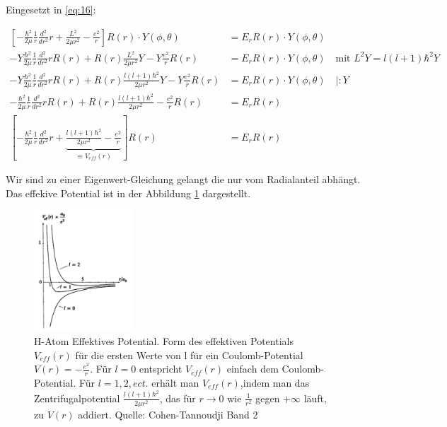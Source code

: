 Eingesetzt in \eqref{eq:16}:

\begin{align}
  \left[-\frac{\hbar^2}{2\mu}\frac{1}{r}\frac{d^2}{dr^2}r + \frac{L^2}{2\mu r^2}  - \frac{e^2}{r} \right]R(r)\cdot Y(\phi,\theta)  &= E_rR(r)\cdot Y(\phi,\theta) \\
  - Y\frac{\hbar^2}{2\mu}\frac{1}{r}\frac{d^2}{dr^2}r R(r) + R(r)\frac{L^2}{2\mu r^2} Y  -Y \frac{e^2}{r} R(r)   &= E_rR(r)\cdot Y(\phi,\theta) \quad \text{mit } L^2Y = l(l+1)\hbar^2 Y\\
  - Y\frac{\hbar^2}{2\mu}\frac{1}{r}\frac{d^2}{dr^2}r R(r) + R(r)\frac{l(l+1)\hbar^2}{2\mu r^2}Y  -Y \frac{e^2}{r} R(r)   &= E_rR(r)\cdot Y(\phi,\theta) \quad |:Y\\
  - \frac{\hbar^2}{2\mu}\frac{1}{r}\frac{d^2}{dr^2}r R(r) + R(r)\frac{l(l+1)\hbar^2}{2\mu r^2}  - \frac{e^2}{r} R(r)   &= E_rR(r)\\
  \left[- \frac{\hbar^2}{2\mu}\frac{1}{r}\frac{d^2}{dr^2}r + \underbrace{\frac{l(l+1)\hbar^2}{2\mu r^2}  - \frac{e^2}{r}}_{\equiv V_{eff}(r)} \right] R(r)   &= E_rR(r)  \label{eq:18}
\end{align}

Wir sind zu einer Eigenwert-Gleichung gelangt die nur vom Radialanteil abhängt. Das effekive Potential ist in der Abbildung \ref{fig:1} dargestellt.

\begin{figure}[ht]
	\centering
  \includegraphics[width=0.33\textwidth]{h-atom_pics/Veff.png}
	\caption{H-Atom Effektives Potential. Form des effektiven Potentials \(V_{eff}(r)\) für die ersten Werte von l für ein Coulomb-Potential \(V(r) = -\frac{e^2}{r}\). Für \(l=0\) entspricht \(V_{eff}(r)\) einfach dem Coulomb-Potential. Für \(l=1,2,ect.\) erhält man \(V_{eff}(r)\),indem man das Zentrifugalpotential \(\frac{l(l+1)\hbar^2}{2\mu r^2}\), das für \(r\to 0\) wie \(\frac{1}{r^2}\) gegen \(+\infty\) läuft, zu \(V(r)\) addiert. Quelle: Cohen-Tannoudji Band 2 }
	\label{fig:1}
\end{figure}


